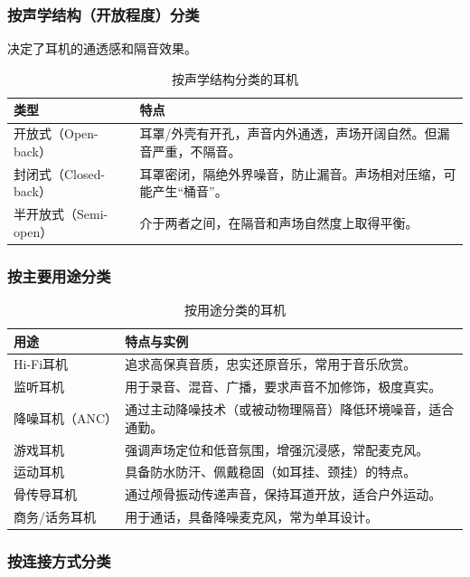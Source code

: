 \documentclass[12pt,UTF8]{ctexbook}
\begin{document}
\subsubsection{按声学结构（开放程度）分类}

决定了耳机的通透感和隔音效果。
	
\begin{table}[h]
\centering
\caption{按声学结构分类的耳机}
\begin{tabular}{p{3cm}p{8cm}}
\toprule
\textbf{类型} & \textbf{特点} \\
\midrule
开放式（Open-back） & 耳罩/外壳有开孔，声音内外通透，声场开阔自然。但漏音严重，不隔音。 \\
封闭式（Closed-back） & 耳罩密闭，隔绝外界噪音，防止漏音。声场相对压缩，可能产生“桶音”。 \\
半开放式（Semi-open） & 介于两者之间，在隔音和声场自然度上取得平衡。 \\
\bottomrule
\end{tabular}
\end{table}
	
\subsubsection{按主要用途分类}

\begin{table}[h]
\centering
\caption{按用途分类的耳机}
\begin{tabular}{p{3cm}p{8cm}}
\toprule
\textbf{用途} & \textbf{特点与实例} \\
\midrule
Hi-Fi耳机 & 追求高保真音质，忠实还原音乐，常用于音乐欣赏。 \\
监听耳机 & 用于录音、混音、广播，要求声音不加修饰，极度真实。 \\
降噪耳机（ANC） & 通过主动降噪技术（或被动物理隔音）降低环境噪音，适合通勤。 \\
游戏耳机 & 强调声场定位和低音氛围，增强沉浸感，常配麦克风。 \\
运动耳机 & 具备防水防汗、佩戴稳固（如耳挂、颈挂）的特点。 \\
骨传导耳机 & 通过颅骨振动传递声音，保持耳道开放，适合户外运动。 \\
商务/话务耳机 & 用于通话，具备降噪麦克风，常为单耳设计。 \\
\bottomrule
\end{tabular}
\end{table}
	
\subsubsection{按连接方式分类}
\end{document}
